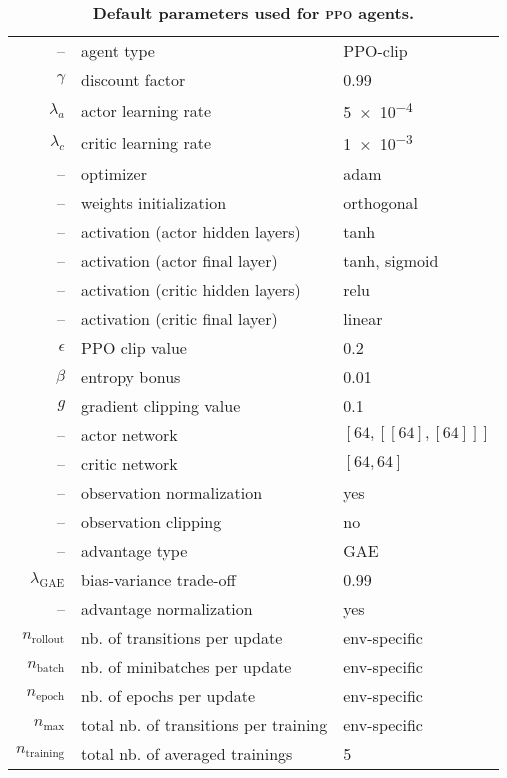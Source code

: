 \begin{table}[h]
    \footnotesize
    \caption{\textbf{Default parameters used for \textsc{ppo} agents.}}
    \label{table:default_ppo_parameters}
    \centering
    \begin{tabular}{rll}
        \toprule
        --					& agent type					& PPO-clip\\
	$\gamma$ 			& discount factor				& 0.99\\
	$\lambda_a$ 			& actor learning rate				& \num{5e-4}\\
	$\lambda_c$ 			& critic learning rate				& \num{1e-3}\\
	--		 			& optimizer					& adam\\
	--					& weights initialization			& orthogonal\\
	--	 				& activation (actor hidden layers)	& tanh\\
	-- 					& activation (actor final layer)		& tanh, sigmoid\\
	--	 				& activation (critic hidden layers)	& relu\\
	-- 					& activation (critic final layer)		& linear\\
	$\epsilon$ 			& PPO clip value				& 0.2\\
	$\beta$				& entropy bonus				& 0.01\\
	$g$					& gradient clipping value			& 0.1\\	
	-- 					& actor network					& $[64, [[64],[64]]]$\\
	-- 					& critic network					& $[64, 64]$\\
	--					& observation normalization		& yes\\
	--					& observation clipping			& no\\
	--					& advantage type				& GAE\\
	$\lambda_\text{GAE}$	& bias-variance trade-off			& 0.99\\
	--					& advantage normalization		& yes\\\midrule
	$n_\text{rollout}$ 		& nb. of transitions per update		& env-specific\\
	$n_\text{batch}$ 		& nb. of minibatches per update 	& env-specific\\
	$n_\text{epoch}$		& nb. of epochs per update		& env-specific\\
	$n_\text{max}$			& total nb. of transitions per training	& env-specific\\
	$n_\text{training}$		& total nb. of averaged trainings	& 5\\
        \bottomrule
    \end{tabular}
\end{table}
